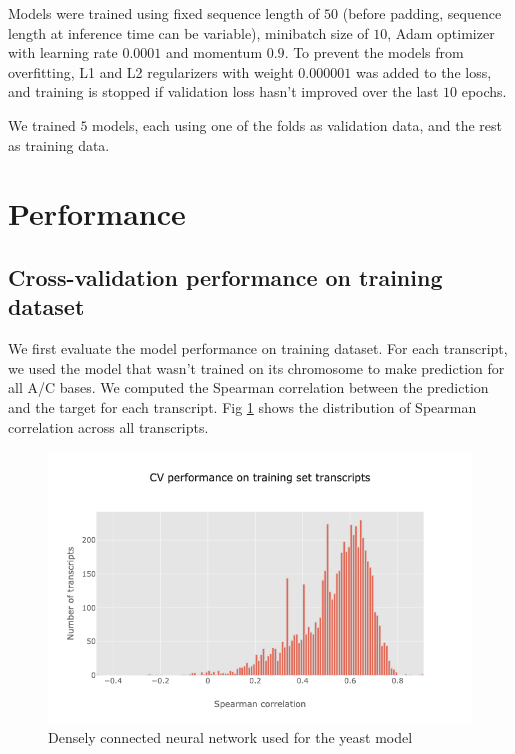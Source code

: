 \documentclass{proposal}
\begin{document}
Models were trained using fixed sequence length of $50$ (before padding, sequence length at inference time can be variable),
minibatch size of $10$, Adam optimizer with learning rate $0.0001$ and momentum $0.9$.
To prevent the models from overfitting, L1 and L2 regularizers with weight $0.000001$ was added to the loss,
and training is stopped if validation loss hasn't improved over the last $10$ epochs.

We trained $5$ models, each using one of the folds as validation data, and the rest as training data.


\section{Performance}


\subsection{Cross-validation performance on training dataset}

We first evaluate the model performance on training dataset.
For each transcript, we used the model that wasn't trained on its chromosome to make prediction for all A/C bases.
We computed the Spearman correlation between the prediction and the target for each transcript.
Fig \ref{fig:yeast_cv_performance} shows the distribution of Spearman correlation across all transcripts.

\begin{figure}[h!]
\includegraphics[width=\textwidth]{yeast_cv_performance.png}
\caption{Densely connected neural network used for the yeast model}
\label{fig:yeast_cv_performance}
\centering
\end{figure}
\end{document}
